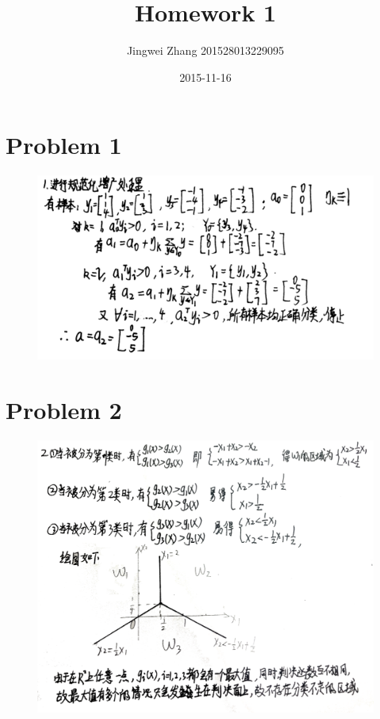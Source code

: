 \documentclass[]{article}
\title{Homework 1}
\date{2015-11-16}
\author{Jingwei Zhang 201528013229095}
\begin{document}
    \maketitle
    \section{Problem 1}
    \begin{figure}[H]
        \centering
        \includegraphics[scale=0.45]{P1.png}
    \end{figure}
    \section{Problem 2}
    \begin{figure}[H]
        \centering
        \includegraphics[scale=0.3]{P2.png}
    \end{figure}
\end{document}

